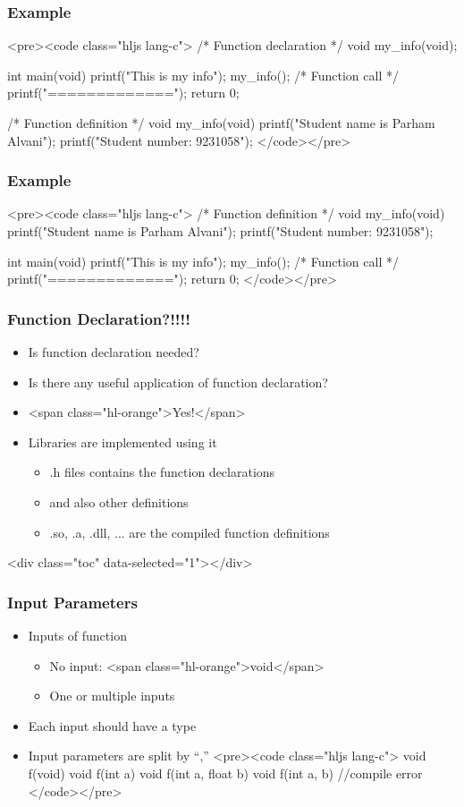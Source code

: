 \documentclass{../c-lecture}
\begin{document}
\begin{frame}
  \frametitle{Example}
  <pre><code class="hljs lang-c">
/* Function declaration */
void my_info(void);

int main(void){
  printf("This is my info");
  my_info(); /* Function call */
  printf("=============");
  return 0;
}

/* Function definition */
void my_info(void){
  printf("Student name is Parham Alvani\n");
  printf("Student number: 9231058\n");
}
  </code></pre>
\end{frame}
\begin{frame}
  \frametitle{Example}
  <pre><code class="hljs lang-c">
/* Function definition */
void my_info(void){
  printf("Student name is Parham Alvani\n");
  printf("Student number: 9231058\n");
}

int main(void){
  printf("This is my info");
  my_info(); /* Function call */
  printf("=============");
  return 0;
}
  </code></pre>
\end{frame}
\begin{frame}
  \frametitle{Function Declaration?!!!!}
  \begin{itemize}
    \item Is function declaration needed?
    \item Is there any useful application of function declaration?
    \item <span class="hl-orange">Yes!</span>
    \item Libraries are implemented using it
    \begin{itemize}
      \item .h files contains the function declarations
      \item and also other definitions
      \item .so, .a, .dll, ... are the compiled function definitions
    \end{itemize}
  \end{itemize}
\end{frame}
\begin{frame}
  <div class="toc" data-selected="1"></div>
\end{frame}
\begin{frame}
  \frametitle{Input Parameters}
  \begin{itemize}
    \item Inputs of function
    \begin{itemize}
      \item No input: <span class="hl-orange">void</span>
      \item One or multiple inputs
    \end{itemize}
    \item Each input should have a type
    \item Input parameters are split by “,”
    <pre><code class="hljs lang-c">
void f(void)
void f(int a)
void f(int a, float b)
void f(int a, b) //compile error
    </code></pre>
  \end{itemize}
\end{frame}
\end{document}
